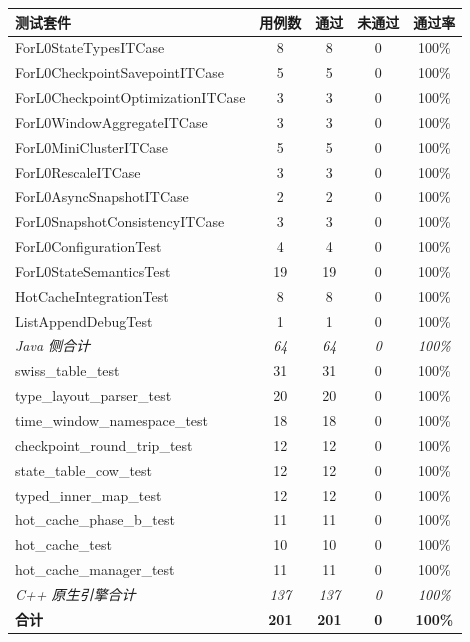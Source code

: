 \documentclass[a4paper,11pt]{article}
\begin{document}
\begin{table}[H]
\centering
\small
\begin{tabular}{@{}l cccc@{}}
\toprule
\textbf{测试套件} & \textbf{用例数} & \textbf{通过} & \textbf{未通过} & \textbf{通过率} \\
\midrule
ForL0StateTypesITCase                   & 8  & 8  & 0 & 100\% \\
ForL0CheckpointSavepointITCase          & 5  & 5  & 0 & 100\% \\
ForL0CheckpointOptimizationITCase       & 3  & 3  & 0 & 100\% \\
ForL0WindowAggregateITCase              & 3  & 3  & 0 & 100\% \\
ForL0MiniClusterITCase                  & 5  & 5  & 0 & 100\% \\
ForL0RescaleITCase                      & 3  & 3  & 0 & 100\% \\
ForL0AsyncSnapshotITCase                & 2  & 2  & 0 & 100\% \\
ForL0SnapshotConsistencyITCase          & 3  & 3  & 0 & 100\% \\
ForL0ConfigurationTest                  & 4  & 4  & 0 & 100\% \\
ForL0StateSemanticsTest                 & 19 & 19 & 0 & 100\% \\
HotCacheIntegrationTest                 & 8  & 8  & 0 & 100\% \\
ListAppendDebugTest                     & 1  & 1  & 0 & 100\% \\
\midrule
\textit{Java 侧合计}                    & \textit{64} & \textit{64} & \textit{0} & \textit{100\%} \\
\midrule
swiss\_table\_test                      & 31 & 31 & 0 & 100\% \\
type\_layout\_parser\_test              & 20 & 20 & 0 & 100\% \\
time\_window\_namespace\_test           & 18 & 18 & 0 & 100\% \\
checkpoint\_round\_trip\_test           & 12 & 12 & 0 & 100\% \\
state\_table\_cow\_test                 & 12 & 12 & 0 & 100\% \\
typed\_inner\_map\_test                 & 12 & 12 & 0 & 100\% \\
hot\_cache\_phase\_b\_test              & 11 & 11 & 0 & 100\% \\
hot\_cache\_test                        & 10 & 10 & 0 & 100\% \\
hot\_cache\_manager\_test               & 11 & 11 & 0 & 100\% \\
\midrule
\textit{C++ 原生引擎合计}                & \textit{137} & \textit{137} & \textit{0} & \textit{100\%} \\
\midrule
\textbf{合计}                            & \textbf{201} & \textbf{201} & \textbf{0} & \textbf{100\%} \\
\bottomrule
\end{tabular}
\end{table}
\end{document}
